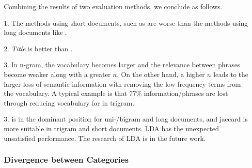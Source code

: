Combining the results of two evaluation methods, we conclude as follows.

1. The methods using short documents, such as \ititle{} are worse than the methods using long documents like \icontent{}. 

2. \textit{Title} is better than \isummary{}.

3. In n-gram, the vocabulary becomes larger and the relevance between phrases become weaker along with a greater $n$. On the other hand, a higher $n$ leads to the larger loss of semantic information with removing the low-frequency terms from the vocabulary. A typical example is that $77\%$ information/phrases are lost through reducing vocabulary for \icontent{} in trigram. 

3. \tfidf{} is in the dominant position for uni-/bigram and long documents, and jaccard is more suitable in trigram and short documents. LDA has the unexpected unsatisfied performance. The research of LDA is in the future work. 




\subsubsection{Divergence between Categories}




